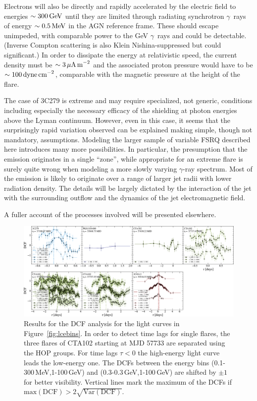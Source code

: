\documentclass[twocolumn,linenumbers]{aastex62}
\newcommand{\Grays}{$\gamma$~rays\xspace}
\newcommand{\gray}{$\gamma$-ray\xspace}
\begin{document}
Electrons will also be directly and rapidly accelerated by the electric field to energies $\sim300\,{\rm GeV}$ until they are limited through radiating synchrotron \Grays of energy $\sim0.5\,{\rm MeV}$ in the AGN reference frame. These should escape unimpeded, with comparable power to the GeV \Grays and could be detectable. (Inverse Compton scattering is also Klein Nishina-suppressed but could significant.) In order to dissipate the energy at relativistic speed, the current density must be $\sim3\,\mu{\rm A\,m}^{-2}$ and the associated proton pressure would have to be $\sim100\,{\rm dyne\,cm}^{-2}$, comparable with the magnetic pressure at the height of the flare.

The  case of 3C279 is extreme and may require specialized, not generic, conditions including especially the necessary efficacy of the shielding at photon energies above the Lyman continuum. However, even in this case, it seems that the surprisingly rapid variation observed can be explained making simple, though not mandatory, assumptions. Modeling the larger sample of variable FSRQ described here introduces many more possibilities. In particular, the presumption that the emission originates in a single ``zone'', while appropriate for an extreme flare is surely quite wrong when modeling a more slowly varying \gray spectrum. Most of the emission is likely to originate over a range of larger jet radii with lower radiation density. The details will be largely dictated by the interaction of the jet with the surrounding outflow and the dynamics of the jet electromagnetic field.

A fuller account of the processes involved will be presented elsewhere.

\begin{figure}
    \centering
    \includegraphics[width = .9 \linewidth]{zdcf_ebins.pdf}
    \caption{Results for the DCF analysis for the light curves in Figure~\ref{fig:lcebins}. In order to detect time lags for single flares, the three flares of CTA102 starting at MJD 57733 are separated using the HOP groups. For time lags $\tau < 0$ the high-energy light curve leads the low-energy one. The DCFs between the energy bins (0.1-300\,MeV,1-100\,GeV) and (0.3-0.3\,GeV,1-100\,GeV) are shifted by $\pm 1$ for better visibility. 
    Vertical lines mark the maximum of the DCFs if $\mathrm{max}(\mathrm{DCF}) > 2 \sqrt{\mathrm{Var}(\mathrm{DCF})}$.}
    \label{fig:zdcf}
\end{figure}
\end{document}
